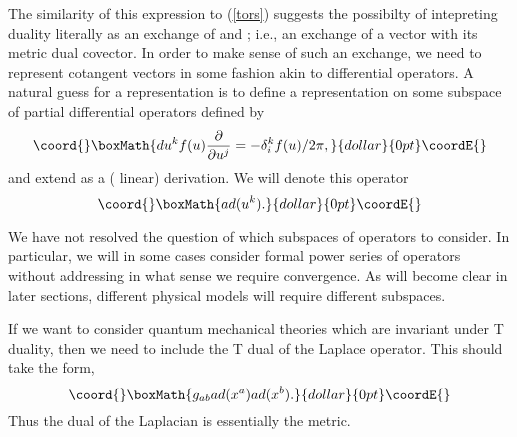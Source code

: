 \documentclass[a4paper,11pt]{amsart}
\begin{document}
 The similarity of this expression to (\ref{tors}) suggests the possibilty of
  intepreting  \coordHE{} duality literally as an exchange of  
\coordHE{} and \coordHE{}; i.e., an exchange of a
vector with its metric dual covector.  In order to make sense
of such an exchange, we need to represent cotangent vectors in some fashion 
akin to differential operators. A natural guess for a representation is
to define a representation on some subspace of partial differential operators
defined by  
$$\coord{}\boxMath{du^kf(u)\frac{\partial}{\partial u^j} = -\delta^k_if(u)/2\pi,}{dollar}{0pt}\coordE{}$$
and extend as a (\coordHE{} linear) derivation. 
We will denote this operator 
$$\coord{}\boxMath{ad(u^k).}{dollar}{0pt}\coordE{}$$

We have not resolved the question of which subspaces of operators to consider.
In particular, we will in some cases consider formal power series of operators
without addressing in what sense we require convergence. 
As will become clear in later sections, different physical models will require
different subspaces. 

If we want to consider quantum mechanical theories which are invariant under T
duality, then we need to include the T dual of the Laplace operator. 
This should take the form, 
$$\coord{}\boxMath{g_{ab}ad(x^a)ad(x^b).}{dollar}{0pt}\coordE{}$$
Thus the dual of the Laplacian is essentially the metric. 
\end{document}
